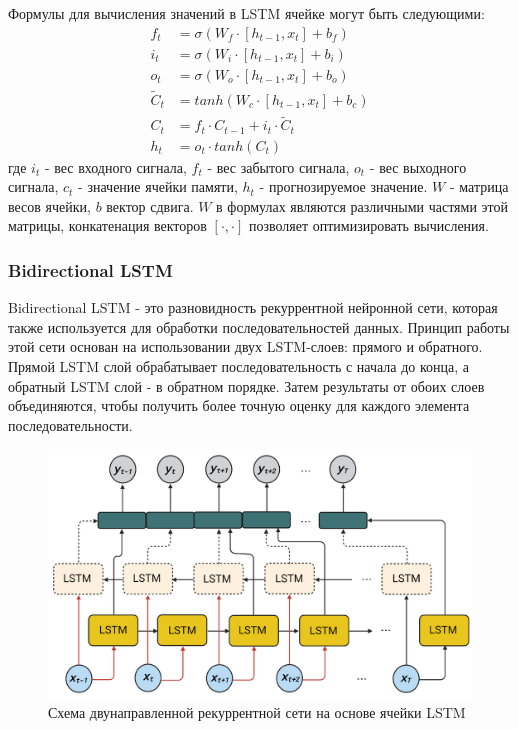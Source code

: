 \documentclass[diploma]{nanolab2015}
\begin{document}
Формулы для вычисления значений в LSTM ячейке могут быть следующими:
\begin{align*}
    f_t             & = \sigma(W_f \cdot [h_{t-1}, x_t] + b_f)        \\
    i_t             & = \sigma(W_i \cdot [h_{t-1}, x_t] + b_i)        \\
    o_t             & = \sigma(W_o \cdot [h_{t-1}, x_t] + b_o)        \\
    \widetilde{C}_t & = tanh(W_c \cdot [h_{t-1}, x_t] + b_c)          \\
    C_t             & = f_t \cdot C_{t-1} + i_t \cdot \widetilde{C}_t \\
    h_t             & = o_t \cdot tanh(C_t)
\end{align*}
где $i_t$ - вес входного сигнала, $f_t$ - вес забытого сигнала, $o_t$ - вес выходного сигнала, $c_t$ - значение ячейки памяти, $h_t$ - прогнозируемое значение. $W$ - матрица весов ячейки, $b$ вектор сдвига. $W$ в формулах являются различными частями этой матрицы, конкатенация векторов $[\cdot, \cdot]$ позволяет оптимизировать вычисления.

\subsubsection{Bidirectional LSTM}
Bidirectional LSTM - это разновидность рекуррентной нейронной сети, которая также используется для обработки последовательностей данных. Принцип работы этой сети основан на использовании двух LSTM-слоев: прямого и обратного.
Прямой LSTM слой обрабатывает последовательность с начала до конца, а обратный LSTM слой - в обратном порядке. Затем результаты от обоих слоев объединяются, чтобы получить более точную оценку для каждого элемента последовательности\cite{book9}.

\begin{figure}[ht]
    \centering
    \includegraphics[scale=0.2]{./assets/lstm-bidirectional.png}
    \caption{Схема двунаправленной рекуррентной сети на основе ячейки LSTM}
    \label{pic2}
\end{figure}
\end{document}
